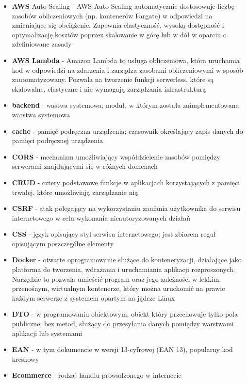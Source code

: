 \documentclass[../main.tex]{subfiles}
\begin{document}
\begin{itemize}
        \item \textbf{AWS} Auto Scaling - AWS Auto Scaling automatycznie dostosowuje liczbę zasobów obliczeniowych (np. kontenerów Fargate) w odpowiedzi na zmieniające się obciążenie. Zapewnia elastyczność, wysoką dostępność i optymalizację kosztów poprzez skalowanie w górę lub w dół w oparciu o zdefiniowane zasady
        \item \textbf{AWS Lambda} - Amazon Lambda to usługa obliczeniowa, która uruchamia kod w odpowiedzi na zdarzenia i zarządza zasobami obliczeniowymi w sposób zautomatyzowany. Pozwala na tworzenie funkcji serwerless, które są skalowalne, elastyczne i nie wymagają zarządzania infrastrukturą
        \item \textbf{backend} - wastwa systemowa; moduł, w którym została zaimplementowana warstwa systemowa
        \item \textbf{cache} - pamięć podręczna urządzenia; czasownik określający zapis danych do pamięci podręcznej urządzenia
        \item \textbf{CORS} - mechanizm umożliwiający współdzielenie zasobów pomiędzy serwerami znajdującymi się w różnych domenach
        \item \textbf{CRUD} - cztery podstawowe funkcje w aplikacjach korzystających z pamięci trwałej, które umożliwiają zarządzanie nią
        \item \textbf{CSRF} - atak polegający na wykorzystaniu zaufania użytkownika do serwisu internetowego w celu wykonania nieautoryzowanych działań
        \item \textbf{CSS} - język opisujący styl serwisu internetowego; jest zbiorem reguł opisującym poszczególne elementy
        \item \textbf{Docker\cite{docker}} - otwarte oprogramowanie służące do konteneryzacji, działające jako platforma do tworzenia, wdrażania i uruchamiania aplikacji rozproszonych. Narzędzie to pozwala umieścić program oraz jego zależności w lekkim, przenośnym, wirtualnym kontenerze, który można uruchomić na prawie każdym serwerze z systemem opartym na jądrze Linux
        \item \textbf{DTO} - w programowaniu obiektowym, obiekt który przechowuje tylko pola publiczne, bez metod, służący do przesyłania danych pomiędzy warstwami aplikacji lub systemami
        \item \textbf{EAN} - w tym dokumencie w wersji 13-cyfrowej (EAN 13), popularny kod kreskowy
        \item \textbf{Ecommerce} - rodzaj handlu prowadzonego w internecie

\end{itemize}
\end{document}
